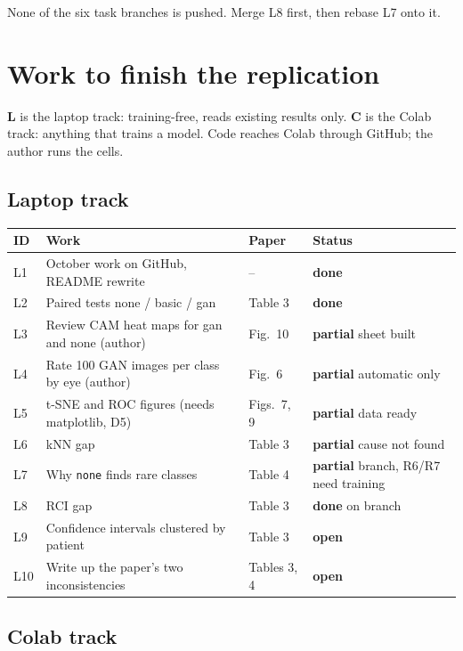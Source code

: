 \documentclass[10pt,a4paper]{article}
\newcommand{\done}{\textcolor{good}{\textbf{done}}}
\newcommand{\partly}{\textcolor{warn}{\textbf{partial}}}
\newcommand{\todo}{\textcolor{bad}{\textbf{open}}}
\begin{document}
\medskip
\noindent
None of the six task branches is pushed. Merge L8 first, then rebase L7 onto it.

\section{Work to finish the replication}

\textbf{L} is the laptop track: training-free, reads existing results only.
\textbf{C} is the Colab track: anything that trains a model. Code reaches Colab through
GitHub; the author runs the cells.

\subsection{Laptop track}

\noindent
\begin{tabularx}{\linewidth}{@{}l Y l l@{}}
\toprule
ID & Work & Paper & Status \\
\midrule
L1 & October work on GitHub, README rewrite & -- & \done \\
L2 & Paired tests none / basic / gan & Table 3 & \done \\
L3 & Review CAM heat maps for gan and none (author) & Fig.~10 & \partly{} sheet built \\
L4 & Rate 100 GAN images per class by eye (author) & Fig.~6 & \partly{} automatic only \\
L5 & t-SNE and ROC figures (needs matplotlib, D5) & Figs.~7, 9 & \partly{} data ready \\
L6 & kNN gap & Table 3 & \partly{} cause not found \\
L7 & Why \texttt{none} finds rare classes & Table 4 & \partly{} branch, R6/R7 need training \\
L8 & RCI gap & Table 3 & \done{} on branch \\
L9 & Confidence intervals clustered by patient & Table 3 & \todo \\
L10 & Write up the paper's two inconsistencies & Tables 3, 4 & \todo \\
\bottomrule
\end{tabularx}

\subsection{Colab track}
\end{document}
